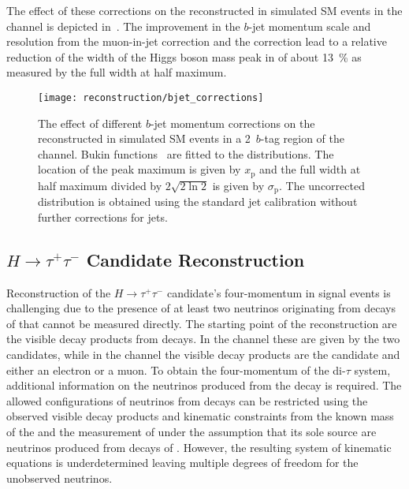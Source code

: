 The effect of these corrections on the reconstructed \mBB in simulated SM \HH
events in the \hadhad channel is depicted
in~. The improvement in the $b$-jet momentum
scale and resolution from the muon-in-jet correction and the \pTreco correction
lead to a relative reduction of the width of the Higgs boson mass peak in \mBB
of about \SI{13}{\percent} as measured by the full width at half maximum.

\begin{figure}[htbp]
  \centering

  \texttt{[image: reconstruction/bjet\_corrections]}

  \caption{The effect of different $b$-jet momentum corrections on the
    reconstructed \mBB in simulated SM \HH events in a 2~$b$-tag region of the
    \hadhad channel. Bukin functions~\cite{Bukin:2007zha} are fitted to the \mBB
    distributions. The location of the peak maximum is given by $x_{\text{p}}$
    and the full width at half maximum divided by $2\sqrt{2 \ln 2}$ is given by
    $\sigma_{\text{p}}$. The uncorrected distribution is obtained using the
    standard jet calibration without further corrections for \btagged jets.}%
  \label{fig:bjet_momentum_corr_mbb}
\end{figure}


\subsection{$H \to \tau^{+}\tau^{-}$ Candidate Reconstruction}%
\label{sec:htautau_reco}


Reconstruction of the $H \to \tau^{+}\tau^{-}$ candidate's
four-momentum in signal events is challenging due to the presence of
at least two neutrinos originating from decays of \tauleptons that
cannot be measured directly. The starting point of the reconstruction
are the visible decay products from \taulepton decays. In the \hadhad
channel these are given by the two \tauhadvis candidates, while in the
\lephad channel the visible decay products are the \tauhadvis
candidate and either an electron or a muon. To obtain the
four-momentum of the di-$\tau$ system, %
additional information on the neutrinos produced from the \taulepton
decay is required. The allowed configurations of neutrinos from
\taulepton decays can be restricted using the observed visible decay
products and kinematic constraints from the known mass of the
\taulepton and the measurement of \pTmiss under the assumption that
its sole source are neutrinos produced from decays of
\tauleptons. However, the resulting system of kinematic equations is
underdetermined leaving multiple degrees of freedom for the unobserved
neutrinos.

